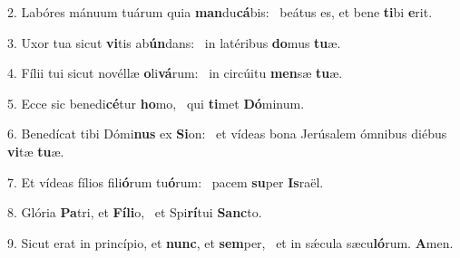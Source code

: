2. Labóres mánuum tuárum quia \textbf{man}du\textbf{cá}bis: \ast\  beátus es, et bene \textbf{ti}bi \textbf{e}rit.\

3. Uxor tua sicut \textbf{vi}tis ab\textbf{ún}dans: \ast\  in latéribus \textbf{do}mus \textbf{tu}æ.\

4. Fílii tui sicut novéllæ \textbf{o}li\textbf{vá}rum: \ast\  in circúitu \textbf{men}sæ \textbf{tu}æ.\

5. Ecce sic benedi\textbf{cé}tur \textbf{ho}mo, \ast\  qui \textbf{ti}met \textbf{Dó}minum.\

6. Benedícat tibi Dómi\textbf{nus} ex \textbf{Si}on: \ast\  et vídeas bona Jerúsalem ómnibus diébus \textbf{vi}tæ \textbf{tu}æ.\

7. Et vídeas fílios fili\textbf{ó}rum tu\textbf{ó}rum: \ast\  pacem \textbf{su}per \textbf{Is}raël.\

8. Glória \textbf{Pa}tri, et \textbf{Fí}\textbf{li}o, \ast\  et Spi\textbf{rí}tui \textbf{Sanc}to.\

9. Sicut erat in princípio, et \textbf{nunc}, et \textbf{sem}per, \ast\  et in sǽcula sæcu\textbf{ló}rum. \textbf{A}men.\

